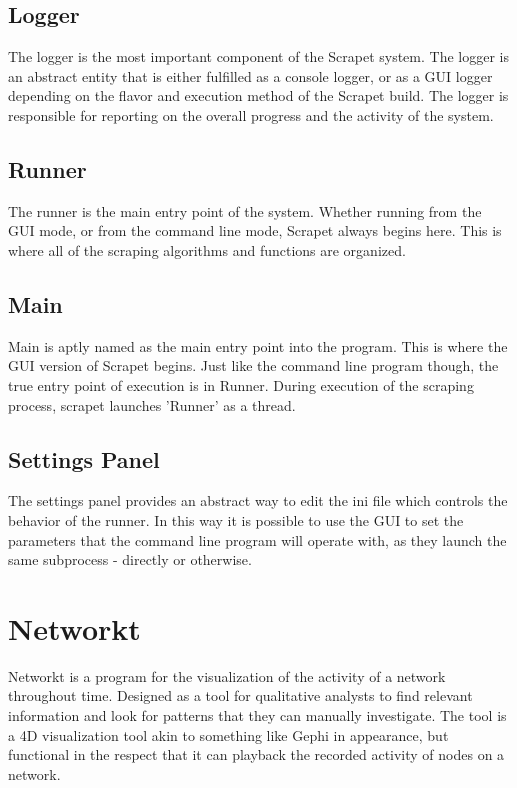 \subsection{Logger}
The logger is the most important component of the Scrapet system. The logger is an abstract entity that is either fulfilled as a console logger, or as a GUI logger depending on the flavor and execution method of the Scrapet build. The logger is responsible for reporting on the overall progress and the activity of the system.

\subsection{Runner}
The runner is the main entry point of the system. Whether running from the GUI mode, or from the command line mode, Scrapet always begins here. This is where all of the scraping algorithms and functions are organized.

\subsection{Main}
Main is aptly named as the main entry point into the program. This is where the GUI version of Scrapet begins. Just like the command line program though, the true entry point of execution is in Runner. During execution of the scraping process, scrapet launches 'Runner' as a thread.

\subsection{Settings Panel}
The settings panel provides an abstract way to edit the ini file which controls the behavior of the runner. In this way it is possible to use the GUI to set the parameters that the command line program will operate with, as they launch the same subprocess - directly or otherwise.

\section{Networkt}
Networkt is a program for the visualization of the activity of a network throughout time. Designed as a tool for qualitative analysts to find relevant information and look for patterns that they can manually investigate. The tool is a 4D visualization tool akin to something like Gephi in appearance, but functional in the respect that it can playback the recorded activity of nodes on a network.

